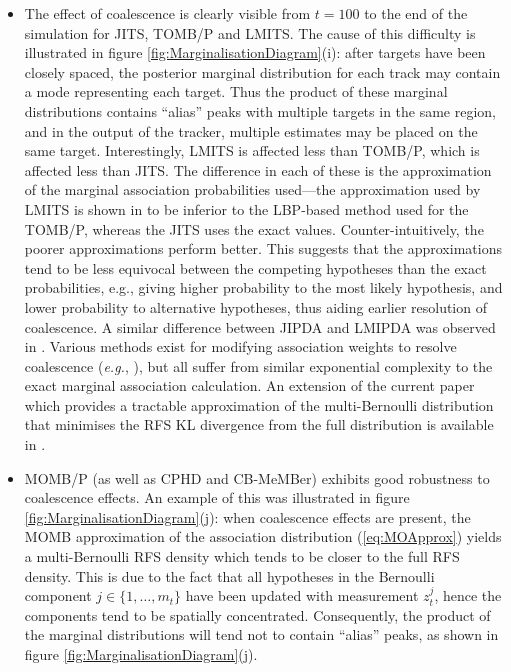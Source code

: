 \documentclass[journal,twoside]{IEEEtran}
\theoremstyle{plain}
\begin{document}
\begin{itemize}
\item The effect of coalescence is clearly visible from $t=100$ to the end of the simulation for JITS, TOMB/P and LMITS. The cause of this difficulty is illustrated in figure \ref{fig:MarginalisationDiagram}(i): after targets have been closely spaced, the posterior marginal distribution for each track may contain a mode representing each target. Thus the product of these marginal distributions contains ``alias'' peaks with multiple targets in the same region, and in the output of the tracker, multiple estimates may be placed on the same target. Interestingly, LMITS is affected less than TOMB/P, which is affected less than JITS. The difference in each of these is the approximation of the marginal association probabilities used---the approximation used by LMITS is shown in \cite{WilLau12} to be inferior to the LBP-based method used for the TOMB/P, whereas the JITS uses the exact values. Counter-intuitively, the poorer approximations perform better. This suggests that the approximations tend to be less equivocal between the competing hypotheses than the exact probabilities, e.g., giving higher probability to the most likely hypothesis, and lower probability to alternative hypotheses, thus aiding earlier resolution of coalescence. A similar difference between JIPDA and LMIPDA was observed in \cite{MusLaS08}. Various methods exist for modifying association weights to resolve coalescence (\textit{e.g.}\xspace, \cite{BloBlo00,SveSve11}), but all suffer from similar exponential complexity to the exact marginal association calculation. An extension of the current paper which provides a tractable approximation of the multi-Bernoulli distribution that minimises the RFS KL divergence from the full distribution is available in \cite{Wil14}.


\item MOMB/P (as well as CPHD and CB-MeMBer) exhibits good robustness to coalescence effects. An example of this was illustrated in figure \ref{fig:MarginalisationDiagram}(j): when coalescence effects are present, the MOMB approximation of the association distribution (\ref{eq:MOApprox}) yields a multi-Bernoulli RFS density which tends to be closer to the full RFS density. This is due to the fact that all hypotheses in the Bernoulli component $j\in\{1,\dots,m_t\}$ have been updated with measurement $z_t^j$, hence the components tend to be spatially concentrated. Consequently, the product of the marginal distributions will tend not to contain ``alias'' peaks, as shown in figure \ref{fig:MarginalisationDiagram}(j).


\end{itemize}
\end{document}
